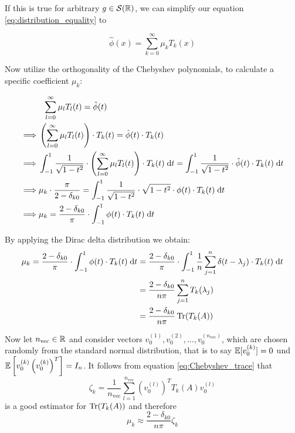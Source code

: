 If this is true for arbitrary $g \in \mathcal{S}(\mathbb{R})$, we can simplify our equation \ref{eq:distribution_equality} to

\begin{equation} \label{eq:Chebyshev-Expansion}
    \hat{\phi}(x) = \sum_{k = 0}^{\infty} \mu_k T_k(x)
\end{equation}


Now utilize the orthogonality of the Chebyshev polynomials, to calculate a specific coefficient $\mu_k$:

\begin{align*}
    & \; \; \sum_{l = 0}^{\infty} \mu_l T_l(t) = \hat{\phi}(t) \\
    \implies & \left(\sum_{l = 0}^{\infty} \mu_l T_l(t)\right) \cdot T_k(t) = \hat{\phi}(t) \cdot T_k(t)\\
    \implies & \int_{-1}^1 \frac{1}{\sqrt{1 - t^2}} \cdot \left(\sum_{l = 0}^{\infty} \mu_l T_l(t)\right) \cdot T_k(t) \;\mathrm{d}t = \int_{-1}^1 \frac{1}{\sqrt{1 - t^2}} \cdot \hat{\phi}(t) \cdot T_k(t) \;\mathrm{d}t\\
    \implies & \mu_k \cdot \frac{\pi}{2 - \delta_{k0}} = \int_{-1}^1 \frac{1}{\sqrt{1 - t^2}} \cdot \sqrt{1 - t^2} \cdot \phi(t) \cdot T_k(t) \;\mathrm{d}t\\
    \implies & \mu_k = \frac{2 - \delta_{k0}}{\pi} \cdot \int_{-1}^1 \phi(t) \cdot T_k(t) \;\mathrm{d}t\\
\end{align*}

By applying the Dirac delta distribution we obtain:
\begin{align*}
    \mu_k = \frac{2 - \delta_{k0}}{\pi} \cdot \int_{-1}^1 \phi(t) \cdot T_k(t) \;\mathrm{d}t &= \frac{2 - \delta_{k0}}{\pi} \cdot \int_{-1}^1 \frac{1}{n} \sum_{j = 1}^n \delta(t - \lambda_j) \cdot T_k(t) \;\mathrm{d}t \\
    &= \frac{2 - \delta_{k0}}{n \pi} \sum_{j = 1}^n T_k(\lambda_j)\\
    &= \frac{2 - \delta_{k0}}{n \pi} \operatorname{Tr}(T_k(A))
\end{align*}

Now let $n_{\text{vec}} \in \mathbb{R}$ and consider vectors $v_0^{(1)}, v_0^{(2)}, \dots, v_0^{(n_{\text{vec}})}$,
which are chosen randomly from the standard normal distribution,
that is to say $\mathbb{E}[v_0^{(k)}] = 0$ und $\mathbb{E}\left[v_0^{(k)}\left(v_0^{(k)}\right)^T\right] = I_n$.
It follows from equation \ref{eq:Chebyshev_trace} that
\[
\zeta_k = \frac{1}{n_{\text{vec}}} \sum_{l = 1}^{n_{\text{vec}}} \left( v_0^{(l)} \right)^T T_k(A) v_0^{(l)}
\]
is a good estimator for $\operatorname{Tr}(T_k(A))$ and therefore
\[
\mu_k \approx \frac{2 - \delta_{k0}}{n \pi} \zeta_k
\]

